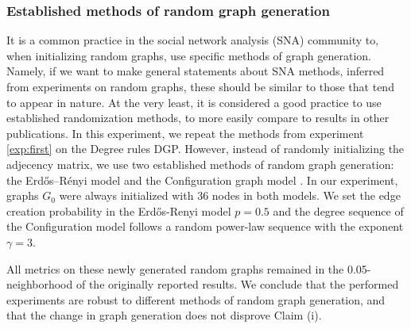 \subsubsection{Established methods of random graph generation}
\label{exp:our1}
It is a common practice in the social network analysis (SNA) community to, when initializing random graphs, use specific methods of graph generation. Namely, if we want to make general statements about SNA methods, inferred from experiments on random graphs, these should be similar to those that tend to appear in nature. At the very least, it is considered a good practice to use established randomization methods, to more easily compare to results in other publications. In this experiment, we repeat the methods from experiment \ref{exp:first} on the Degree rules DGP. However, instead of randomly initializing the adjecency matrix, we use two established methods of random graph generation: the Erdős–Rényi model \cite{erdHos1959renyi} and the Configuration graph model \cite{newman2003structure}. In our experiment, graphs $G_{0}$ were always initialized with 36 nodes in both models. We set the edge creation probability in the Erdős-Renyi model $p=0.5$ and the degree sequence of the Configuration model follows a random power-law sequence with the exponent $\gamma = 3$.

All metrics on these newly generated random graphs remained in the 0.05-neighborhood of the originally reported results. We conclude that the performed experiments are robust to different methods of random graph generation, and that the change in graph generation does not disprove Claim (i).








